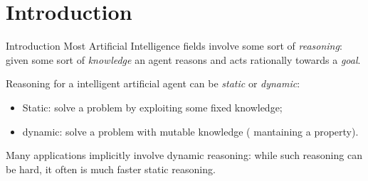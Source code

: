 \section*{Introduction}

\begin{frame}{Introduction}
    Most Artificial Intelligence fields involve some sort of \textit{reasoning}: given some sort of \textit{knowledge} an agent reasons and acts rationally towards a \textit{goal}.

    Reasoning for a intelligent artificial agent can be \textit{static} or \textit{dynamic}:
    \begin{itemize}
        \item Static: solve a problem by exploiting some fixed knowledge;
        \item dynamic: solve a problem with mutable knowledge (\eg{} mantaining a property).
    \end{itemize}


    Many applications implicitly involve dynamic reasoning: 
    while such reasoning can be hard, it often is much faster \wrt{} static reasoning.
\end{frame}

